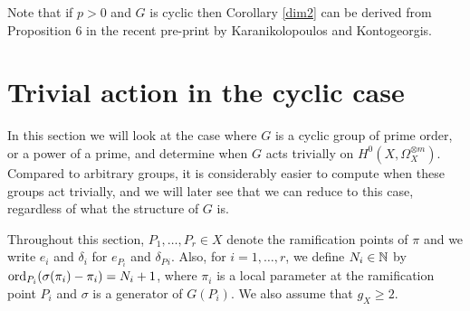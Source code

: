     \begin{rem}
    Note that if $p>0$ and $G$ is cyclic then Corollary \ref{dim2} can be derived from Proposition $6$ in the recent pre-print \cite{kako} by Karanikolopoulos and Kontogeorgis.
    \end{rem}



\section{Trivial action in the cyclic case}

In this section we will look at the case where $G$ is a cyclic group of prime order, or a power of a prime, and determine when $G$ acts trivially on $H^0(X,\Omega_X^{\otimes m})$.
Compared to arbitrary groups, it is considerably easier to compute when these groups act trivially, and we will later see that we can reduce to this case, regardless of what the structure of $G$ is.


Throughout this section, $P_1,\ldots ,P_r \in X$ denote the ramification points of $\pi$ and we write $e_i$ and $\delta_i$ for $e_{P_i}$ and $\delta_P{_i}$.
Also, for $i=1, \ldots, r$, we define $N_i \in {\mathbb N}$ by $\operatorname{ord}_{P_i}(\sigma(\pi_i) - \pi_i) = N_i +1$, where $\pi_i$ is a local parameter at the ramification point $P_i$ and $\sigma$ is a generator of $G(P_i)$. 
We also assume that $g_X \geq 2$.


